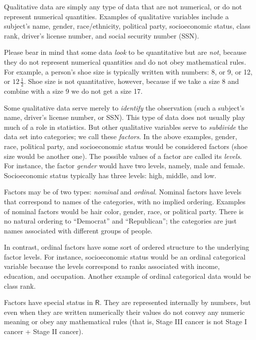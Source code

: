 \documentclass[10pt,english]{scrbook}
\begin{document}
Qualitative data are simply any type of data that are not numerical, or do not represent numerical quantities. Examples of qualitative variables include a subject's name, gender, race/ethnicity, political party, socioeconomic status, class rank, driver's license number, and social security number (SSN).

Please bear in mind that some data \emph{look} to be quantitative but are \emph{not}, because they do not represent numerical quantities and do not obey mathematical rules. For example, a person's shoe size is typically written with numbers: 8, or 9, or 12, or \(12\,\frac{1}{2}\). Shoe size is not quantitative, however, because if we take a size 8 and combine with a size 9 we do not get a size 17.

Some qualitative data serve merely to \emph{identify} the observation (such a subject's name, driver's license number, or SSN). This type of data does not usually play much of a role in statistics. But other qualitative variables serve to \emph{subdivide} the data set into categories; we call these \emph{factors}. In the above examples, gender, race, political party, and socioeconomic status would be considered factors (shoe size would be another one). The possible values of a factor are called its \emph{levels}. For instance, the factor \emph{gender} would have two levels, namely, male and female. Socioeconomic status typically has three levels: high, middle, and low.

Factors may be of two types: \emph{nominal} and \emph{ordinal}. Nominal factors have levels that correspond to names of the categories, with no implied ordering. Examples of nominal factors would be hair color, gender, race, or political party. There is no natural ordering to ``Democrat'' and ``Republican''; the categories are just names associated with different groups of people. 

In contrast, ordinal factors have some sort of ordered structure to the underlying factor levels. For instance, socioeconomic status would be an ordinal categorical variable because the levels correspond to ranks associated with income, education, and occupation. Another example of ordinal categorical data would be class rank.

Factors have special status in \(\mathsf{R}\). They are represented internally by numbers, but even when they are written numerically their values do not convey any numeric meaning or obey any mathematical rules (that is, Stage III cancer is not Stage I cancer + Stage II cancer).
\end{document}
